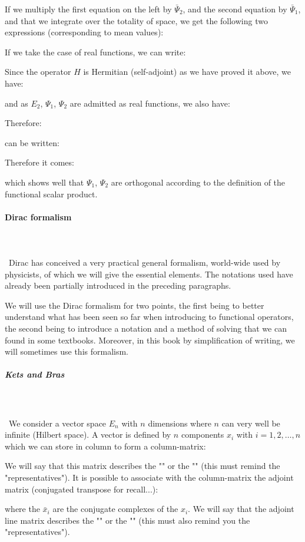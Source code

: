	If we multiply the first equation on the left by $\bar{\Psi}_2$, and the second equation by $\bar{\Psi}_1$, and that we integrate over the totality of space, we get the following two expressions (corresponding to mean values):
	
	If we take the case of real functions, we can write:
	
	Since the operator $H$ is Hermitian (self-adjoint) as we have proved it above, we have:
	
	and as $E_2$, $\Psi_1$, $\Psi_2$ are admitted as real functions, we also have:
	
	Therefore:
	
	can be written:
	
	Therefore it comes:
	
	which shows well that $\Psi_1$, $\Psi_2$ are orthogonal according to the definition of the functional scalar product.
	
	\paragraph{Dirac formalism}\mbox{}\\\\\
Dirac has conceived a very practical general formalism, world-wide used by physicists, of which we will give the essential elements. The notations used have already been partially introduced in the preceding paragraphs.

	We will use the Dirac formalism for two points, the first being to better understand what has been seen so far when introducing to functional operators, the second being to introduce a notation and a method of solving that we can found in some textbooks. Moreover, in this book by simplification of writing, we will sometimes use this formalism.

	\subparagraph{Kets and Bras}\mbox{}\\\\\
	We consider a vector space $E_n$ with $n$ dimensions where $n$ can very well be infinite (Hilbert space). A vector is defined by $n$ components $x_i$ with $i=1,2,\ldots,n$ which we can store in column to form a column-matrix:
	
	We will say that this matrix describes the "\NewTerm{right vector}" or the "\NewTerm{ket $| x\rangle$}\index{ket}" (this must remind the "representatives"). It is possible to associate with the column-matrix the adjoint matrix (conjugated transpose for recall...):
	
	where the $\bar{x}_i$ are the conjugate complexes of the $x_i$. We will say that the adjoint line matrix describes the "\NewTerm{left vector}" or the "\NewTerm{bra $\langle x|$}\index{bra}" (this must also remind you the "representatives").
	
